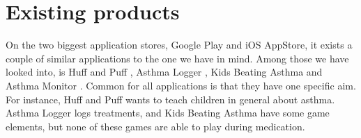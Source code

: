 \section{Existing products}
\label{exisiting-products}

On the two biggest application stores, Google Play and iOS AppStore, it exists a couple of similar applications to the one we have in mind. Among those we have looked into, is Huff and Puff , Asthma Logger
, Kids Beating Asthma  and Asthma Monitor . Common for all applications is that they have one specific aim. For instance, Huff and Puff wants to teach children in general about asthma. Asthma Logger logs treatments, and Kids Beating Asthma have some game elements, but none of these games are able to play during medication. 

